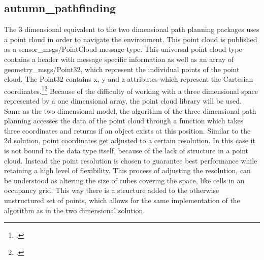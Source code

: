 \subsection{autumn\_pathfinding}
The 3 dimensional equivalent to the two dimensional path planning packages uses a point cloud in order to navigate the environment. This point cloud is published as a sensor\_msgs/PointCloud message type. This universal point cloud type contains a header with message specific information as well as an array of geometry\_msgs/Point32, which represent the individual points of the point cloud. The Point32 contains x, y and z attributes which represent the Cartesian coordinates.\footcite{rosGeometryMsgsPoint322021}\footcite{rosSensorMsgsPointCloud2021}\newline
Because of the difficulty of working with a three dimensional space represented by a one dimensional array, the point cloud library will be used. Same as the two dimensional model, the algorithm of the three dimensional path planning accesses the data of the point cloud through a function which takes three coordinates and returns if an object exists at this position.\newline
Similar to the 2d solution, point coordinates get adjusted to a certain resolution. In this case it is not bound to the data type itself, because of the lack of structure in a point cloud. Instead the point resolution is chosen to guarantee best performance while retaining a high level of flexibility. This process of adjusting the resolution, can be understood as altering the size of cubes covering the space, like cells in an occupancy grid. This way there is a structure added to the otherwise unstructured set of points, which allows for the same implementation of the algorithm as in the two dimensional solution. 

